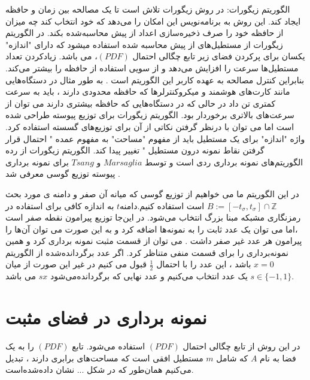 
الگوریتم زیگورات:
در روش زیگورات تلاش است تا یک مصالحه بین زمان و حافظه ایجاد کند. این روش به برنامه‌نویس این امکان را می‌دهد که خود انتخاب کند چه میزان از حافظه خود را صرف ذخیره‌سازی اعداد از پیش محاسبه‌شده بکند. 
در الگوریتم زیگورات از مستطیل‌های از پیش محاسبه شده استفاده میشود که دارای "اندازه" یکسان برای پرکردن فضای زیر تابع چگالی احتمال $(PDF)$، می باشد. زیادکردن تعداد مستطیل‌ها سرعت را افزایش می‌دهد و از سویی استفاده از حافظه را بیشتر می‌کند. بنابراین کنترل مصالحه به عهده کاربر این الگوریتم است . به طور مثال در دستگاه‌هایی مانند کارت‌های هوشمند و میکروکنترلرها که حافظه محدودی دارند ، باید به سرعت کمتری تن داد در حالی که در دستگاه‌هایی که حافظه بیشتری دارند می توان از سرعت‌های بالاتری برخوردار بود. الگوریتم زیگورات برای توزیع پیوسته طراحی شده است اما می توان با درنظر گرفتن نکاتی از آن برای توزیع‌های گسسته استفاده کرد. واژه "اندازه" برای یک مستطیل  باید از مفهوم "مساحت" به مفهوم عمده " احتمال قرار گرفتن نقاط نمونه درون مستطیل " تغییر پیدا کند. 
الگوریتم زیگورات از رده الگوریتم‌های نمونه برداری ردی است و توسط $Marsaglia$  و $Tsang$  برای نمونه برداری پیوسته توزیع گوسی معرفی شد . 
  
در این الگوریتم ما می خواهیم از توزیع گوسی که میانه آن صفر و دامنه ی مورد بحث $B :=[-t_{\sigma}, t_{\sigma}]\cap \mathbb{Z}$   است استفاده کنیم.دامنه$t$ به اندازه کافی  برای  استفاده در رمزنگاری مشبکه مبنا بزرگ انتخاب می‌شود. در این‌جا توزیع پیرامون نقطه صفر است ،اما می توان یک عدد ثابت را به نمونه‌ها اضافه کرد و به این صورت می توان آن‌ها را پیرامون هر عدد غیر صفر داشت .
می توان از قسمت مثبت نمونه برداری کرد و همین نمونه‌برداری را برای قسمت منفی متناظر کرد. اگر عدد برگردانده‌شده از الگوریتم $x = 0$ باشد ، این عدد را با احتمال $\frac{1}{2}$ قبول می کنیم در غیر این صورت از میان $s\in \lbrace -1, 1\rbrace $ یک عدد انتخاب می‌کنیم و عدد نهایی که برگردانده‌می‌شود $sx$ می باشد.
\section{نمونه برداری در فضای مثبت }

در این روش از تابع چگالی احتمال $(PDF)$ استفاده می‌شود.  تابع $(PDF)$ را به یک فضا به نام $A$  که شامل $m$ مستطیل افقی است که مساحت‌های برابری دارند  ، تبدیل می‌کنیم همان‌طور که در شکل ... نشان داده‌شده‌است.

